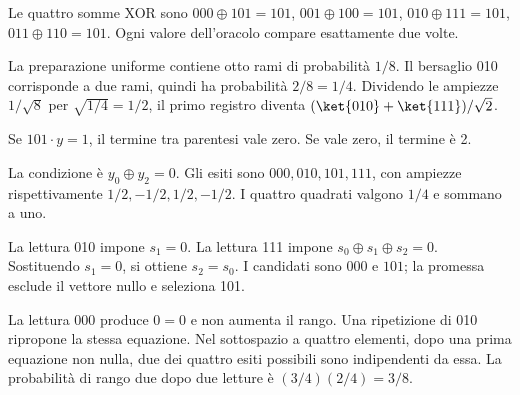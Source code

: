 \ExSolution


Le quattro somme XOR sono \(000\oplus101=101\), \(001\oplus100=101\), \(010\oplus111=101\), \(011\oplus110=101\). Ogni valore dell’oracolo compare esattamente due volte.


La preparazione uniforme contiene otto rami di probabilità \(1/8\). Il bersaglio 010 corrisponde a due rami, quindi ha probabilità \(2/8=1/4\). Dividendo le ampiezze \(1/\sqrt8\) per \(\sqrt{1/4}=1/2\), il primo registro diventa \((\ket{010}+\ket{111})/\sqrt2\).


Se \(101\cdot y=1\), il termine tra parentesi vale zero. Se vale zero, il termine è 2.


La condizione è \(y_0\oplus y_2=0\). Gli esiti sono \(000,010,101,111\), con ampiezze rispettivamente \(1/2,-1/2,1/2,-1/2\). I quattro quadrati valgono \(1/4\) e sommano a uno.


La lettura 010 impone \(s_1=0\). La lettura 111 impone \(s_0\oplus s_1\oplus s_2=0\). Sostituendo \(s_1=0\), si ottiene \(s_2=s_0\). I candidati sono \(000\) e \(101\); la promessa esclude il vettore nullo e seleziona 101.


La lettura 000 produce \(0=0\) e non aumenta il rango. Una ripetizione di 010 ripropone la stessa equazione. Nel sottospazio a quattro elementi, dopo una prima equazione non nulla, due dei quattro esiti possibili sono indipendenti da essa. La probabilità di rango due dopo due letture è \((3/4)(2/4)=3/8\).

\par\noindent\begin{minipage}{\linewidth}





\end{minipage}
